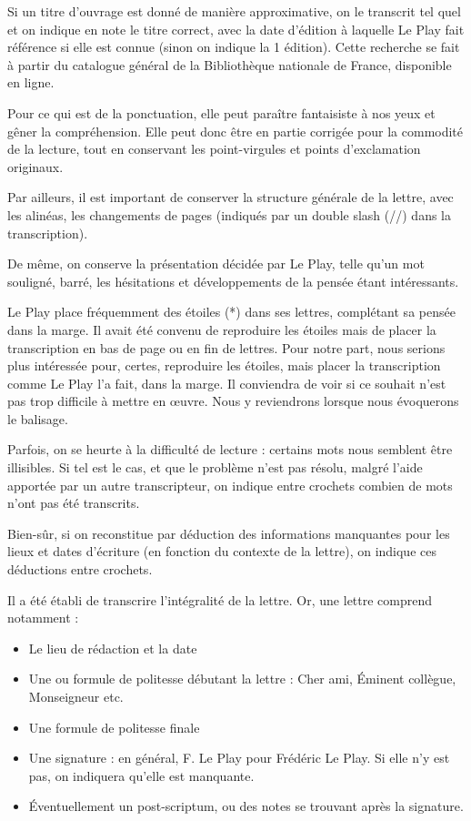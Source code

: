 Si un titre d’ouvrage est donné de manière approximative, on le transcrit tel quel et on indique en note le titre correct, avec la date d’édition à laquelle Le Play fait référence si elle est connue (sinon on indique la 1 édition). Cette recherche se fait à partir du catalogue général de la Bibliothèque nationale de France, disponible en ligne.

Pour ce qui est de la ponctuation, elle peut paraître fantaisiste à nos yeux et gêner la compréhension. Elle peut donc être en partie corrigée pour la commodité de la lecture, tout en conservant les point-virgules et points d'exclamation originaux.

Par ailleurs, il est important de conserver la structure générale de la lettre, avec les alinéas, les changements de pages (indiqués par un double slash (//) dans la transcription).

De même, on conserve la présentation décidée par Le Play, telle qu'un mot souligné, barré, les hésitations et développements de la pensée étant intéressants.

Le Play place fréquemment des étoiles (*) dans ses lettres, complétant sa pensée dans la marge. Il avait été convenu de reproduire les étoiles mais de placer la transcription en bas de page ou en fin de lettres. Pour notre part, nous serions plus intéressée pour, certes, reproduire les étoiles, mais placer la transcription comme Le Play l'a fait, dans la marge. Il conviendra de voir si ce souhait n'est pas trop difficile à mettre en \oe uvre. Nous y reviendrons lorsque nous évoquerons le balisage.

Parfois, on se heurte à la difficulté de lecture : certains mots nous semblent être illisibles. Si tel est le cas, et que le problème n'est pas résolu, malgré l'aide apportée par un autre transcripteur, on indique entre crochets combien de mots n'ont pas été transcrits. 

Bien-sûr, si on reconstitue par déduction des informations manquantes pour les lieux et dates d'écriture (en fonction du contexte de la lettre), on indique ces déductions entre crochets. 

Il a été établi de transcrire l'intégralité de la lettre. Or, une lettre comprend notamment : 
\begin{itemize}
    \item Le lieu de rédaction et la date
    \item Une  ou formule de politesse débutant la lettre : Cher ami, Éminent collègue, Monseigneur etc. 
    \item Une formule de politesse finale
    \item Une signature : en général, F. Le Play pour Frédéric Le Play. Si elle n'y est pas, on indiquera qu'elle est manquante.
    \item Éventuellement un post-scriptum, ou des notes se trouvant après la signature.
\end{itemize}

